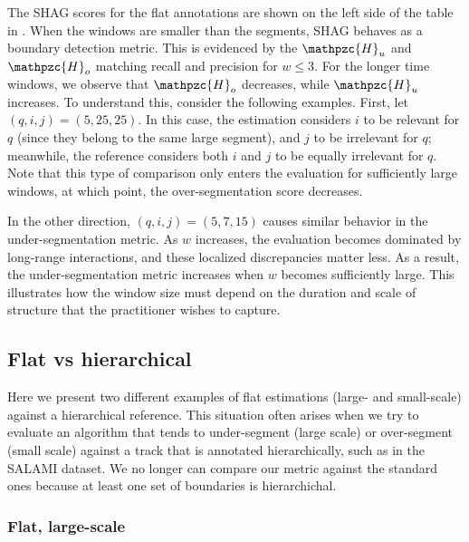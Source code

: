 \documentclass{article}
\def\shag{\ensuremath{\mathpzc{H}}}
\begin{document}
The SHAG scores for the flat annotations are shown on the left side of the table in .
When the windows are smaller than the segments, SHAG behaves as a boundary detection
metric.  This is evidenced by the $\shag_u$ and $\shag_o$ matching recall and
precision for $w \leq 3$.
For the longer time windows, we observe that $\shag_o$ decreases, while $\shag_u$ 
increases.  To understand this, consider the following examples.  First, let
$(q,i,j) = (5,25,25)$.  In this case, the estimation considers $i$ to be relevant for
$q$ (since they belong to the same large segment), and $j$ to be irrelevant for $q$;
meanwhile, the reference considers both $i$ and $j$ to be equally irrelevant for $q$.
Note that this type of comparison only enters the evaluation for sufficiently large
windows, at which point, the over-segmentation score decreases.  

In the other direction, $(q,i,j) = (5, 7, 15)$ causes similar behavior in the
under-segmentation metric.  As $w$ increases, the evaluation becomes dominated by
long-range interactions, and these localized discrepancies matter less.  As a result,
the under-segmentation metric increases when $w$ becomes sufficiently large.
This illustrates how the window size must depend on the duration and scale
of structure that the practitioner wishes to capture. 

\subsection{Flat vs hierarchical}

Here we present two different examples of flat estimations (large- and small-scale) against a hierarchical reference.
This situation often arises when we try to evaluate an algorithm that tends to under-segment (large scale) or over-segment (small scale) against a track that is annotated
hierarchically, such as in the SALAMI dataset.
We no longer can compare our metric against the standard ones because at least one set of boundaries is hierarchichal.

\subsubsection{Flat, large-scale}
\end{document}
